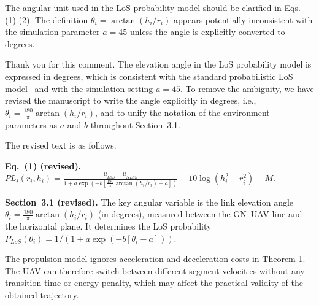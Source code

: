 \reviewer

\begin{revcomment}
	The angular unit used in the LoS probability model should be clarified in Eqs. (1)-(2). The definition $\theta_i=\arctan(h_i/r_i)$ appears potentially inconsistent with the simulation parameter $a=45$ unless the angle is explicitly converted to degrees.
\end{revcomment}

\begin{revresponse}[]
	Thank you for this comment. The elevation angle in the LoS probability model is expressed in degrees, which is consistent with the standard probabilistic LoS model~\cite{alhourani2014optimal} and with the simulation setting $a=45$. To remove the ambiguity, we have revised the manuscript to write the angle explicitly in degrees, i.e., $\theta_i=\frac{180}{\pi}\arctan(h_i/r_i)$, and to unify the notation of the environment parameters as $a$ and $b$ throughout Section~3.1.

	The revised text is as follows.
	\begin{changes}
		\textbf{Eq.~(1) (revised).} $PL_i(r_i,h_i)=\frac{\mu_{LoS}-\mu_{NLoS}}{1+a \exp(-b[\frac{180}{\pi}\arctan(h_i/r_i)-a])}+10\log(h_i^2+r_i^2)+M$.

		\textbf{Section~3.1 (revised).} The key angular variable is the link elevation angle $\theta_i=\frac{180}{\pi}\arctan(h_i/r_i)$ (in degrees), measured between the GN--UAV line and the horizontal plane. It determines the LoS probability $P_{LoS}(\theta_i)=1/(1+a\exp(-b[\theta_i-a]))$.
	\end{changes}
\end{revresponse}

\begin{revcomment}
	The propulsion model ignores acceleration and deceleration costs in Theorem 1. The UAV can therefore switch between different segment velocities without any transition time or energy penalty, which may affect the practical validity of the obtained trajectory.
\end{revcomment}


